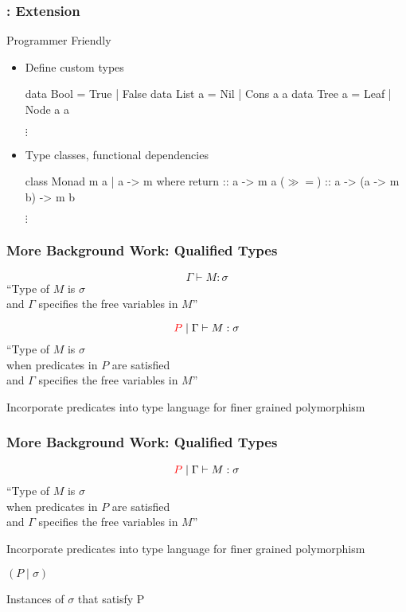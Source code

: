 \begin{frame}[c, fragile]
  \frametitle{\qub{}: Extension}
  \begin{center}
   {\LARGE Programmer Friendly}
   \begin{itemize}
   \item<1-> Define custom types

   \begin{haskell}
                  data Bool   = True | False
                  data List a = Nil  | Cons a a
                  data Tree a = Leaf | Node a a

                               $\vdots$
   \end{haskell}

   \item<2-> Type classes, functional dependencies

    \begin{haskell}
                  class Monad m a | a -> m where
                      return :: a -> m a
                      ($\gg\!=$)  :: a -> (a -> m b) -> m b

                           $\vdots$
   \end{haskell}
 \end{itemize}

 \end{center}
\end{frame}


\begin{frame}[c]
  \frametitle{More Background Work: Qualified Types}
  \begin{center}
    {\LARGE   $$\Gamma \vdash M:\sigma $$}
``Type of $M$ is $\sigma$\\
  and $\Gamma$ specifies the free variables in $M$''

  {\LARGE   $${\color{red}P} \mid \Gamma \vdash M:\sigma $$}
``Type of $M$ is $\sigma$\\
  when predicates in $P$ are satisfied\\
  and $\Gamma$ specifies the free variables in $M$''\cite{jones_theory_1994}

  Incorporate predicates into type language for finer grained polymorphism
  \end{center}
\end{frame}

\begin{frame}[c]
  \frametitle{More Background Work: Qualified Types}
  \begin{center}
  {\LARGE   $${\color{red}P} \mid \Gamma \vdash M:\sigma $$}
``Type of $M$ is $\sigma$\\
  when predicates in $P$ are satisfied\\
  and $\Gamma$ specifies the free variables in $M$''\cite{jones_theory_1994}

  Incorporate predicates into type language for finer grained polymorphism


  {\LARGE $(P \mid \sigma)$}

  Instances of $\sigma$ that satisfy P
  \end{center}
\end{frame}

